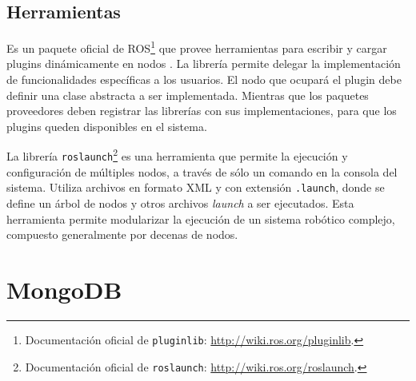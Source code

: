 \subsection{Herramientas}

 Es un paquete oficial de ROS\footnote{Documentación oficial de \texttt{pluginlib}: \url{http://wiki.ros.org/pluginlib}.} que provee herramientas para escribir y cargar plugins dinámicamente en nodos \CC. La librería permite delegar la implementación de funcionalidades específicas a los usuarios. El nodo que ocupará el plugin debe definir una clase abstracta a ser implementada. Mientras que los paquetes proveedores deben registrar las librerías con sus implementaciones, para que los plugins queden disponibles en el sistema.

 La librería \texttt{roslaunch}\footnote{Documentación oficial de \texttt{roslaunch}: \url{http://wiki.ros.org/roslaunch}.} es una herramienta que permite la ejecución y configuración de múltiples nodos, a través de sólo un comando en la consola del sistema. Utiliza archivos en formato XML y con extensión \texttt{.launch}, donde se define un árbol de nodos y otros archivos \textit{launch} a ser ejecutados. Esta herramienta permite modularizar la ejecución de un sistema robótico complejo, compuesto generalmente por decenas de nodos.



\section{MongoDB}\label{sec:mongodb}


